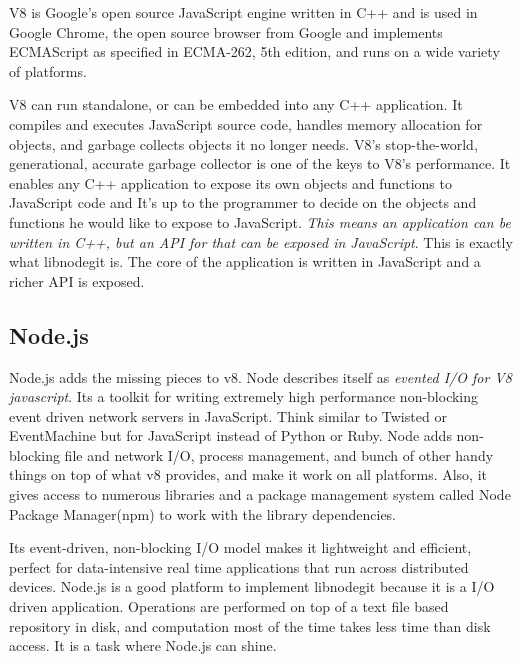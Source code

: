 V8 is Google's open source JavaScript engine written in C++ and is used in
Google Chrome, the open source browser from Google and implements ECMAScript as
specified in ECMA-262, 5th edition, and runs on a wide variety of platforms.

V8 can run standalone, or can be embedded into any C++ application. It compiles
and executes JavaScript source code, handles memory allocation for objects, and
garbage collects objects it no longer needs. V8’s stop-the-world, generational,
accurate garbage collector is one of the keys to V8’s performance. It enables
any C++ application to expose its own objects and functions to JavaScript code
and It’s up to the programmer to decide on the objects and functions he would
like to expose to JavaScript. \textit{This means an application can be written
  in C++, but an API for that can be exposed in JavaScript}. This is exactly
what libnodegit is. The core of the application is written in JavaScript and a
richer API is exposed.

\subsection{Node.js }

Node.js adds the missing pieces to v8. Node describes itself as \textit{evented
  I/O for V8 javascript}. Its a toolkit for writing extremely high performance
non-blocking event driven network servers in JavaScript. Think similar to
Twisted\cite{twisted} or EventMachine\cite{eventmachine} but for JavaScript
instead of Python or Ruby. Node adds non-blocking file and network I/O, process
management, and bunch of other handy things on top of what v8 provides, and make
it work on all platforms. Also, it gives access to numerous libraries and a
package management system called Node Package Manager(npm)\cite{npm} to work
with the library dependencies.

Its event-driven, non-blocking I/O model makes it lightweight and efficient,
perfect for data-intensive real time applications that run across distributed
devices. Node.js is a good platform to implement libnodegit because it is a I/O
driven application. Operations are performed on top of a text file based
repository in disk, and computation most of the time takes less time than disk
access. It is a task where Node.js can shine.
